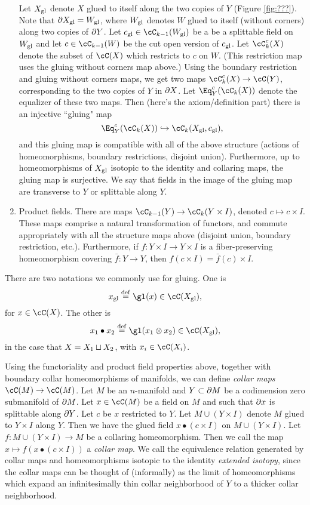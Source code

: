 \begin{enumerate}
Let $X_\mathrm{gl}$ denote $X$ glued to itself along the two copies of $Y$
(Figure \ref{fig:???}).
Note that $\partial X_\mathrm{gl} = W_\mathrm{gl}$, where $W_\mathrm{gl}$ denotes $W$ glued to itself
(without corners) along two copies of $\partial Y$.
Let $c\sgl \in \cC_{k-1}(W\sgl)$ be a be a splittable field on $W_\mathrm{gl}$ and let
$c \in \cC_{k-1}(W)$ be the cut open version of $c_\mathrm{gl}$.
Let $\cC^c_k(X)$ denote the subset of $\cC(X)$ which restricts to $c$ on $W$.
(This restriction map uses the gluing without corners map above.)
Using the boundary restriction and gluing without corners maps, 
we get two maps $\cC^c_k(X) \to \cC(Y)$, corresponding to the two
copies of $Y$ in $\partial X$.
Let $\Eq^c_Y(\cC_k(X))$ denote the equalizer of these two maps.
Then (here's the axiom/definition part) there is an injective ``gluing" map
\[
	\Eq^c_Y(\cC_k(X)) \hookrightarrow \cC_k(X\sgl, c\sgl) ,
\]
and this gluing map is compatible with all of the above structure (actions
of homeomorphisms, boundary restrictions, disjoint union).
Furthermore, up to homeomorphisms of $X_\mathrm{gl}$ isotopic to the identity
and collaring maps,
the gluing map is surjective.
We say that fields in the image of the gluing map
are transverse to $Y$ or splittable along $Y$.
\item Product fields.
There are maps $\cC_{k-1}(Y) \to \cC_k(Y \times I)$, denoted
$c \mapsto c\times I$.
These maps comprise a natural transformation of functors, and commute appropriately
with all the structure maps above (disjoint union, boundary restriction, etc.).
Furthermore, if $f: Y\times I \to Y\times I$ is a fiber-preserving homeomorphism
covering $\bar{f}:Y\to Y$, then $f(c\times I) = \bar{f}(c)\times I$.
\end{enumerate}

There are two notations we commonly use for gluing.
One is 
\[
	x\sgl \deq \gl(x) \in \cC(X\sgl) , 
\]
for $x\in\cC(X)$.
The other is
\[
	x_1\bullet x_2 \deq \gl(x_1\otimes x_2) \in \cC(X\sgl) , 
\]
in the case that $X = X_1 \sqcup X_2$, with $x_i \in \cC(X_i)$.

\medskip

Using the functoriality and product field properties above, together
with boundary collar homeomorphisms of manifolds, we can define 
{\it collar maps} $\cC(M)\to \cC(M)$.
Let $M$ be an $n$-manifold and $Y \subset \partial M$ be a codimension zero submanifold
of $\partial M$.
Let $x \in \cC(M)$ be a field on $M$ and such that $\partial x$ is splittable along $\partial Y$.
Let $c$ be $x$ restricted to $Y$.
Let $M \cup (Y\times I)$ denote $M$ glued to $Y\times I$ along $Y$.
Then we have the glued field $x \bullet (c\times I)$ on $M \cup (Y\times I)$.
Let $f: M \cup (Y\times I) \to M$ be a collaring homeomorphism.
Then we call the map $x \mapsto f(x \bullet (c\times I))$ a {\it collar map}.
We call the equivalence relation generated by collar maps and
homeomorphisms isotopic to the identity {\it extended isotopy}, since the collar maps
can be thought of (informally) as the limit of homeomorphisms
which expand an infinitesimally thin collar neighborhood of $Y$ to a thicker
collar neighborhood.


